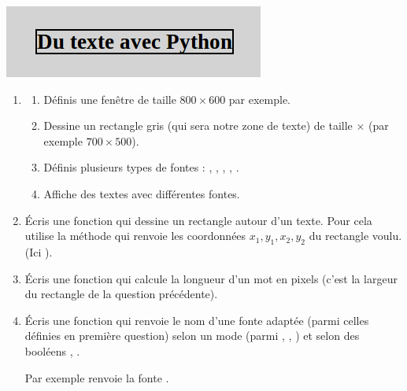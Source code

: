 \documentclass[11pt,class=report,crop=false]{standalone}
\begin{document}
\begin{activite}


\begin{center}
\includegraphics[scale=0.6]{ecran-markdown-2}
\end{center}

\begin{enumerate}
  \item 
  \begin{enumerate}
    \item Définis une fenêtre  de taille $800 \times 600$ par exemple.

    \item Dessine un rectangle gris (qui sera notre zone de texte) de taille  $\times$  (par exemple $700 \times 500$).

    \item Définis plusieurs types de fontes : , , , , .
    
    \item Affiche des textes avec différentes fontes.
  \end{enumerate}
    
  \item Écris une fonction  qui dessine un rectangle autour d'un texte. Pour cela utilise la méthode  qui renvoie les coordonnées $x_1,y_1,x_2,y_2$ du rectangle voulu. (Ici ).
  
  \item Écris une fonction  qui calcule la longueur d'un mot en pixels (c'est la largeur du rectangle de la question précédente).
  
  \item Écris une fonction  qui renvoie le nom d'une fonte adaptée (parmi celles définies en première question) selon un mode (parmi , , ) et selon des booléens , .
  
  Par exemple  renvoie la fonte .
\end{enumerate}

\end{activite}
\end{document}
